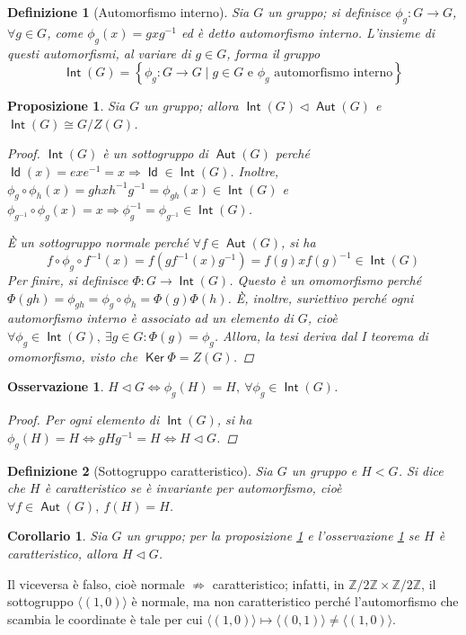 \documentclass[11pt]{scrartcl}
\theoremstyle{style1}
\newtheorem{osservazione}{Osservazione}[section]
\newtheorem{prop}{Proposizione}[section]
\newtheorem{corollario}{Corollario}[teorema]
\newtheorem{definizione}{Definizione}[section]
\numberwithin{equation}{subsection}
\renewcommand{\operatorname}[1]{\mathop{\mathrm{\textsf{#1}}}}
\begin{document}
\begin{definizione}
	[Automorfismo interno]
	Sia $G$ un gruppo; si definisce $\phi _g :G\to G$, $ \forall g \in G$, come $\phi_g (x) =gxg^{-1} $ ed \`e detto \textit{automorfismo interno}. 
	L'insieme di questi automorfismi, al variare di $g \in G$, forma il gruppo
	\[
	\operatorname{Int} (G) = \left\{ \phi _g : G\to G  \mid g \in G \text{ e } \phi _g \text{ automorfismo interno} \right\} 
	\] 
\end{definizione}
\begin{prop}\label{intcar}
	Sia $G$ un gruppo; allora $\operatorname{Int} (G) \lhd \operatorname{Aut} (G)$ e $\operatorname{Int} (G) \cong G / Z(G)$.
	\begin{proof}
		$\operatorname{Int} (G)$ \`e un sottogruppo di $\operatorname{Aut} (G)$ perch\'e $\operatorname{Id} (x) = exe^{-1} = x  \Rightarrow \operatorname{Id} \in \operatorname{Int} (G)$.
		Inoltre, $\phi _g \circ \phi _h (x) = ghxh^{-1}g^{-1}=\phi _{gh} (x) \in \operatorname{Int} (G)$ e $\phi _{g^{-1} } \circ \phi _g (x) = x \Rightarrow \phi _g^{-1} = \phi _{g^{-1}} \in \operatorname{Int}(G)  $.

		\`E un sottogruppo normale perch\'e $\forall f \in \operatorname{Aut} (G)$, si ha 
		\[
		f \circ \phi _g \circ f^{-1}(x) = f \left(g f^{-1}(x) g^{-1}\right) =f(g) x f(g)^{-1} \in \operatorname{Int} (G)
		\] 
		Per finire, si definisce $\Phi : G \to \operatorname{Int} (G) $.
		Questo \`e un omomorfismo perch\'e $\Phi(gh)=\phi _{gh} = \phi _g\circ \phi _h = \Phi(g)\Phi(h)$.
		\`E, inoltre, suriettivo perch\'e ogni automorfismo interno \`e associato ad un elemento di $G$, cio\`e $\forall \phi _g \in \operatorname{Int} (G), \ \exists g \in G : \Phi(g) = \phi _g$.
		Allora, la tesi deriva dal I teorema di omomorfismo, visto che $\operatorname{Ker} \Phi = Z(G)$.
	\end{proof}
\end{prop}
\begin{osservazione}\label{ossnorm}
	$H \lhd G \iff \phi _g(H) = H, \ \forall \phi _g \in \operatorname{Int} (G)$.
	\begin{proof}
Per ogni elemento di $\operatorname{Int} (G)$, si ha $\phi _g (H) = H \iff gH g^{-1} = H \iff H \lhd G$.
	\end{proof}
	\end{osservazione}
\begin{definizione}
	[Sottogruppo caratteristico]
	Sia $G$ un gruppo e $H < G$. Si dice che $H$ \`e \textit{caratteristico} se \`e invariante per automorfismo, cio\`e $\forall f \in \operatorname{Aut} (G), \ f(H) = H$.
\end{definizione}
\begin{corollario}
	Sia $G$ un gruppo; per la proposizione \ref{intcar} e l'osservazione \ref{ossnorm} se $H$ \`e caratteristico, allora $H \lhd G$.
\end{corollario}
\noindent Il viceversa \`e falso, cio\`e normale $\not\Rightarrow $ caratteristico; infatti, in $\mathbb{Z} / 2\mathbb{Z} \times  \mathbb{Z} / 2\mathbb{Z}$, il sottogruppo $\langle (1,0) \rangle$ \`e normale, ma non caratteristico perch\'e l'automorfismo che scambia le coordinate \`e tale per cui $\langle (1,0) \rangle\mapsto \langle (0,1) \rangle\neq \langle (1,0) \rangle$.
\end{document}
